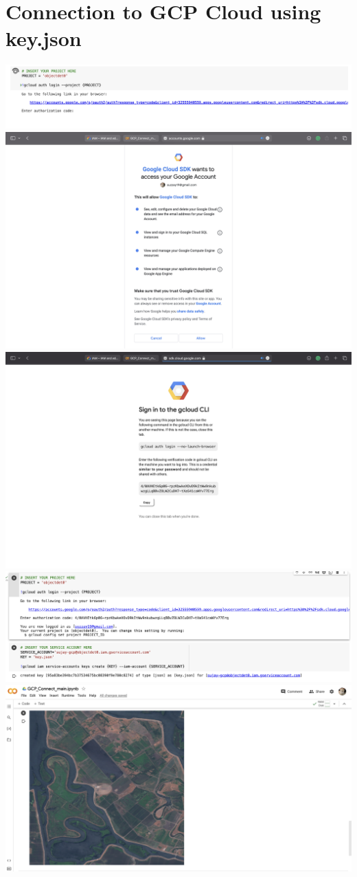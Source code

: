 \section{Connection to GCP Cloud using key.json}
\includegraphics[scale=0.4]{screenshts/14.png}
\includegraphics[scale=0.4]{screenshts/15.png}
\includegraphics[scale=0.4]{screenshts/16.png}
\includegraphics[scale=0.4]{screenshts/17.png}
\includegraphics[scale=0.4]{screenshts/18.png}